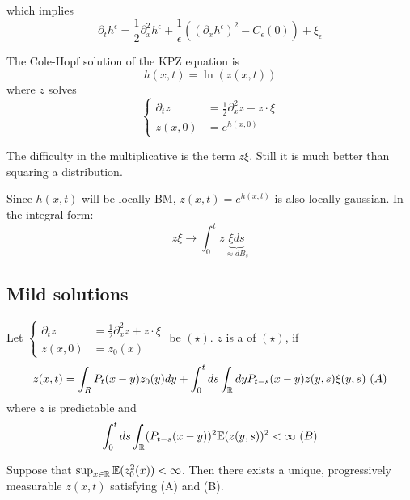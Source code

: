 which implies 
\[\partial_t h^\epsilon = \frac{1}{2}\partial_x^2 h^\epsilon+\frac{1}{\epsilon}\left((\partial_x h^\epsilon)^2-C_\epsilon(0)\right)+\xi_\epsilon\]

The Cole-Hopf solution of the KPZ equation is 
\[h(x,t)=\ln(z(x,t))\]
where $z$ solves \[\begin{cases}
    \partial_t z &= \frac{1}{2}\partial_x^2 z +z\cdot\xi \\
    z(x,0)&=e^{h(x,0)}
\end{cases}\]

The difficulty in the multiplicative  is the term $z\xi$.
Still it is much better than squaring a distribution.

Since $h(x,t)$ will be locally BM, $z(x,t)=e^{h(x,t)}$ is also locally gaussian. In the integral form:
\[z\xi\to \int_0^t z\underbrace{\xi ds}_{\approx dB_s}\]

\subsection{Mild solutions}

\begin{definition}\label{def:5.7}
    Let $\begin{cases}
        \partial_t z&=\frac{1}{2}\partial_x^2 z + z\cdot \xi \\
        z(x,0)&=z_0(x)
    \end{cases}$ be $(\star)$. $z$ is a  of $(\star)$, if 
    \[z(x,t)=\int_R P_t (x-y)z_0(y)dy+\int_0^tds\int_\R dy P_{t-s}(x-y)z(y,s)\xi(y,s)\ (A)\]
    where $z$ is predictable and 
    \[\int_0^tds\int_{\mathbb{R}} (P_{t-s}(x-y))^2\mathbb{E}(z(y,s))^2<\infty\ (B)\]
\end{definition}

\begin{theorem}\label{thm:5.8}
    Suppose that $\sup_{x\in\mathbb{R}}\mathbb{E}(z_0^2(x))<\infty$. Then there exists a unique, progressively measurable $z(x,t)$ satisfying 
    (A) and (B).
\end{theorem}

